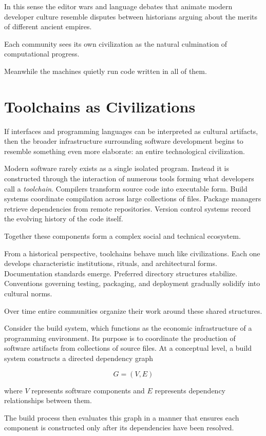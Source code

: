\documentclass[11pt]{article}
\theoremstyle{definition}
\begin{document}
In this sense the editor wars and language debates that animate modern
developer culture resemble disputes between historians arguing about
the merits of different ancient empires.

Each community sees its own civilization as the natural culmination of
computational progress.

Meanwhile the machines quietly run code written in all of them.

\section{Toolchains as Civilizations}

If interfaces and programming languages can be interpreted as cultural
artifacts, then the broader infrastructure surrounding software
development begins to resemble something even more elaborate: an
entire technological civilization.

Modern software rarely exists as a single isolated program. Instead it
is constructed through the interaction of numerous tools forming what
developers call a \emph{toolchain}. Compilers transform source code
into executable form. Build systems coordinate compilation across
large collections of files. Package managers retrieve dependencies
from remote repositories. Version control systems record the evolving
history of the code itself.

Together these components form a complex social and technical
ecosystem.

From a historical perspective, toolchains behave much like
civilizations. Each one develops characteristic institutions,
rituals, and architectural forms. Documentation standards emerge.
Preferred directory structures stabilize. Conventions governing
testing, packaging, and deployment gradually solidify into cultural
norms.

Over time entire communities organize their work around these shared
structures.

Consider the build system, which functions as the economic
infrastructure of a programming environment. Its purpose is to
coordinate the production of software artifacts from collections of
source files. At a conceptual level, a build system constructs a
directed dependency graph

\[
G = (V, E)
\]

where $V$ represents software components and $E$ represents dependency
relationships between them.

The build process then evaluates this graph in a manner that ensures
each component is constructed only after its dependencies have been
resolved.
\end{document}
